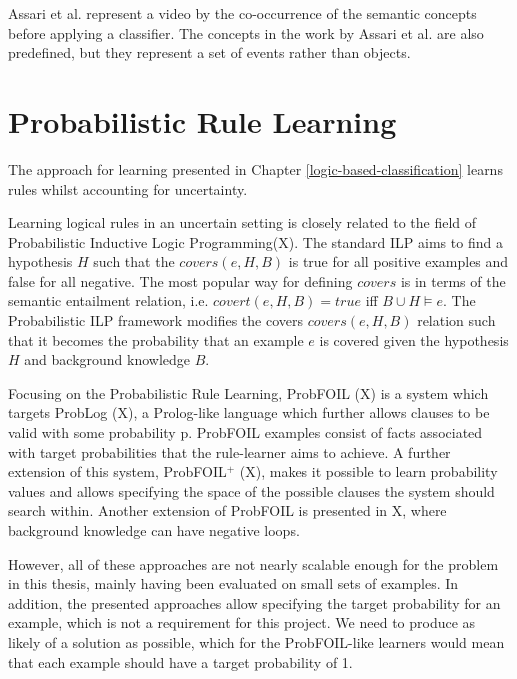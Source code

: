 Assari et al. \cite{RefWorks:RefID:52-assari2014video} represent a video by the co-occurrence of the semantic concepts before applying a classifier.
The concepts in the work by Assari et al. are also predefined, but they represent a set of events rather than objects.


\section{Probabilistic Rule Learning}

The approach for learning presented in Chapter \ref{logic-based-classification} learns rules whilst accounting for uncertainty.

Learning logical rules in an uncertain setting is closely related to the field of Probabilistic Inductive Logic Programming(X).
The standard ILP aims to find a hypothesis $H$ such that the $covers(e, H, B)$ is true for all positive examples and false for all negative.
The most popular way for defining $covers$ is in terms of the semantic entailment relation, i.e. $covert(e, H, B) = true$ iff $B \cup H \vDash e$.
The Probabilistic ILP framework modifies the covers $covers(e, H, B)$ relation such that it becomes the probability that an example $e$ is covered given the hypothesis $H$ and background knowledge $B$.

Focusing on the Probabilistic Rule Learning, ProbFOIL (X) is a system which targets ProbLog (X), a Prolog-like language which further allows clauses to be valid with some probability p.
ProbFOIL examples consist of facts associated with target probabilities that the rule-learner aims to achieve.
A further extension of this system, ProbFOIL$^+$ (X), makes it possible to learn probability values and allows specifying the space of the possible clauses the system should search within.
Another extension of ProbFOIL is presented in X, where background knowledge can have negative loops.

However, all of these approaches are not nearly scalable enough for the problem in this thesis, mainly having been evaluated on small sets of examples.
In addition, the presented approaches allow specifying the target probability for an example, which is not a requirement for this project.
We need to produce as likely of a solution as possible, which for the ProbFOIL-like learners would mean that each example should have a target probability of 1.

